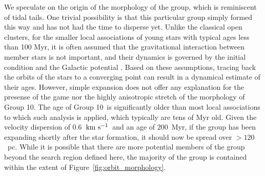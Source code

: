 \documentclass[modern,letterpaper]{aastex61}
\newcommand{\figname}{Figure}
\newcommand{\groupTen}{Group 10}
\newcommand{\kms}{\ensuremath{\rm km~s^{-1}}}
\begin{document}
We speculate on the origin of the morphology of the group,
which is reminiscent of tidal tails.
One trivial possibility is that this particular group simply formed this way and
has not had the time to disperse yet.
Unlike the classical open clusters, for the smaller local associations of young stars
with typical ages less than 100 Myr,
it is often assumed that the gravitational interaction between member stars
is not important, and their dynamics is governed by the initial condition and
the Galactic potential \citep{1997MNRAS.285..479B,2018arXiv180300573M}.
Based on these assumptions, tracing back the orbits of the stars to a converging point
can result in a dynamical estimate of their ages.
However, simple expansion does not offer any explanation for the presense of the game
nor the highly anisotropic stretch of the morphology of \groupTen.
The age of \groupTen\ is significantly older than most local associations to
which such analysis is applied, which typically are tens of Myr old.
Given the velocity dispersion of $0.6$~\kms\ and an age of $200$~Myr,
if the group has been expanding shortly after the star formation,
it should now be spread over $>120$~pc.
While it is possible that there are more potential members of the group
beyond the search region defined here, the majority of the group is contained within
the extent of \figname~\ref{fig:orbit_morphology}.
\end{document}
